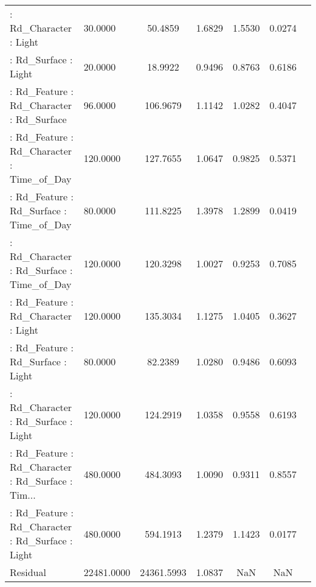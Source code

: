 \begin{longtable}{p{6cm}lccccc}
 : Rd\_Character : Light                            &    30.0000 &    50.4859 &   1.6829 &  1.5530 &     0.0274 \\
 : Rd\_Surface : Light                              &    20.0000 &    18.9922 &   0.9496 &  0.8763 &     0.6186 \\
 : Rd\_Feature : Rd\_Character : Rd\_Surface          &    96.0000 &   106.9679 &   1.1142 &  1.0282 &     0.4047 \\
 : Rd\_Feature : Rd\_Character : Time\_of\_Day         &   120.0000 &   127.7655 &   1.0647 &  0.9825 &     0.5371 \\
 : Rd\_Feature : Rd\_Surface : Time\_of\_Day           &    80.0000 &   111.8225 &   1.3978 &  1.2899 &     0.0419 \\
 : Rd\_Character : Rd\_Surface : Time\_of\_Day         &   120.0000 &   120.3298 &   1.0027 &  0.9253 &     0.7085 \\
 : Rd\_Feature : Rd\_Character : Light               &   120.0000 &   135.3034 &   1.1275 &  1.0405 &     0.3627 \\
 : Rd\_Feature : Rd\_Surface : Light                 &    80.0000 &    82.2389 &   1.0280 &  0.9486 &     0.6093 \\
 : Rd\_Character : Rd\_Surface : Light               &   120.0000 &   124.2919 &   1.0358 &  0.9558 &     0.6193 \\
 : Rd\_Feature : Rd\_Character : Rd\_Surface : Tim... &   480.0000 &   484.3093 &   1.0090 &  0.9311 &     0.8557 \\
 : Rd\_Feature : Rd\_Character : Rd\_Surface : Light  &   480.0000 &   594.1913 &   1.2379 &  1.1423 &     0.0177 \\
Residual                                           & 22481.0000 & 24361.5993 &   1.0837 &     NaN &        NaN \\
\end{longtable}
